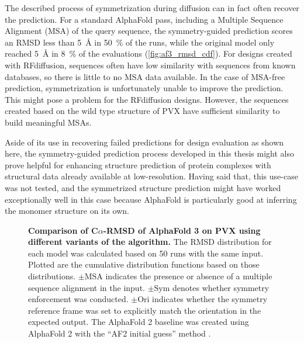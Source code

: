The described process of symmetrization during diffusion can in fact often recover the prediction. For a standard AlphaFold pass, including a Multiple Sequence Alignment (MSA) of the query sequence, the symmetry-guided prediction scores an RMSD less than \SI{5}{\angstrom} in \SI{50}{\percent} of the runs, while the original model only reached \SI{5}{\angstrom} in \SI{8}{\percent} of the evaluations (\autoref{fig:af3_rmsd_cdf}). For designs created with RFdiffusion, sequences often have low similarity with sequences from known databases, so there is little to no MSA data available. In the case of MSA-free prediction, symmetrization is unfortunately unable to improve the prediction. This might pose a problem for the RFdiffusion designs. However, the sequences created based on the wild type structure of PVX have sufficient similarity to build meaningful MSAs. 

Aside of its use in recovering failed predictions for design evaluation as shown here, the symmetry-guided prediction process developed in this thesis might also prove helpful for enhancing structure prediction of protein complexes with structural data already available at low-resolution. Having said that, this use-case was not tested, and the symmetrized structure prediction might have worked exceptionally well in this case because AlphaFold is particularly good at inferring the monomer structure on its own.

\begin{figure}

\caption{\textbf{Comparison of C$\alpha$-RMSD of AlphaFold 3 on PVX using different variants of the algorithm. } The RMSD distribution for each model was calculated based on 50 runs with the same input. Plotted are the cumulative distribution functions based on those distributions. $\pm\text{MSA}$ indicates the presence or absence of a multiple sequence alignment in the input. $\pm\text{Sym}$ denotes whether symmetry enforcement was conducted. $\pm\text{Ori}$ indicates whether the symmetry reference frame was set to explicitly match the orientation in the expected output. The AlphaFold 2 baseline was created using AlphaFold 2 with the ``AF2 initial guess'' method \cite{binder_design}. } 
\label{fig:af3_rmsd_cdf}
\end{figure}

